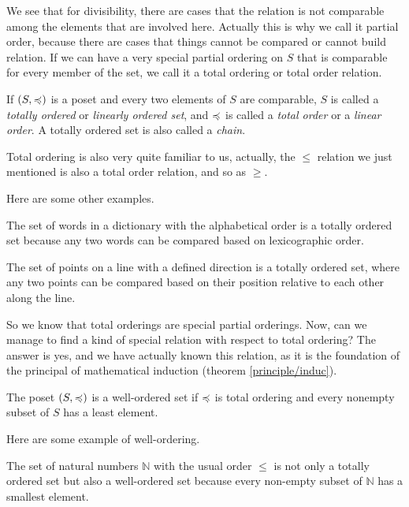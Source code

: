 We see that for divisibility, there are cases that the relation is not comparable among the elements that are involved here. Actually this is why we call it partial order, because there are cases that things cannot be compared or cannot build relation. If we can have a very special partial ordering on $S$ that is comparable for every member of the set, we call it a total ordering or total order relation.

\begin{definition}
	If \( (S, \preccurlyeq) \) is a poset and every two elements of \( S \) are comparable, \( S \) is called a \emph{totally ordered} or \emph{linearly ordered set}, and \( \preccurlyeq \) is called a \emph{total order} or a \emph{linear order}. A totally ordered set is also called a \emph{chain}.
\end{definition}

Total ordering is also very quite familiar to us, actually, the $\leq$ relation we just mentioned is also a total order relation, and so as $\geq$. 

Here are some other examples.
\begin{example}
	The set of words in a dictionary with the alphabetical order is a totally ordered set because any two words can be compared based on lexicographic order.
\end{example}

\begin{example}
	The set of points on a line with a defined direction is a totally ordered set, where any two points can be compared based on their position relative to each other along the line.
\end{example}
So we know that total orderings are special partial orderings. Now, can we manage to find a kind of special relation with respect to total ordering? The answer is yes, and we have actually known this relation, as it is the foundation of the principal of mathematical induction (theorem \ref{principle/induc}).

\begin{definition}
	The poset $(S, \preccurlyeq)$ is a well-ordered set if $\preccurlyeq$ is total ordering and every nonempty subset of $S$ has a least element.
\end{definition}

Here are some example of well-ordering.

\begin{example}
	The set of natural numbers \( \mathbb{N} \) with the usual order \( \leq \) is not only a totally ordered set but also a well-ordered set because every non-empty subset of \( \mathbb{N} \) has a smallest element.
\end{example}


